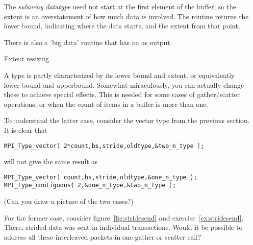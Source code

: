 The \emph{subarray datatype} need not
start at the first element of the buffer, so the extent is an
overstatement of how much data is involved. The routine
 returns the lower bound,
indicating where the data starts, and the extent from that point.

\begin{comment}
  Suppose we implement gather (see also Section Gather ) as a spanning
  tree implemented on top of point-to-point routines. Since the receive
  buffer is only valid on the root process, one will need to allocate
  some temporary space for receiving data on intermediate
  nodes. However, the datatype extent cannot be used as an estimate of
  the amount of space that needs to be allocated, if the user has
  modified the extent, for example by using MPI_TYPE_CREATE_RESIZED. The
  functions MPI_TYPE_GET_TRUE_EXTENT and MPI_TYPE_GET_TRUE_EXTENT_X are
  provided which return the true extent of the datatype.
\end{comment}


There is also a `big data' routine 
that has an  as output.

 {Extent resizing}

A type is partly characterized by its lower bound and extent,
or equivalently lower bound and upperbound.
Somewhat miraculously, you can actually change these to achieve special effects.
This is needed for some cases of gather/scatter operations, or when the count
of items in a buffer is more than one.

To understand the latter case, consider the vector type from the previous section.
It is clear that
\begin{lstlisting}
MPI_Type_vector( 2*count,bs,stride,oldtype,&two_n_type );
\end{lstlisting}
will not give the same result as
\begin{lstlisting}
MPI_Type_vector( count,bs,stride,oldtype,&one_n_type );
MPI_Type_contiguous( 2,&one_n_type,&two_n_type );
\end{lstlisting}
(Can you draw a picture of the two cases?)

For the former case, consider figure~\ref{fig:stridesend} and exercise~\ref{ex:stridesend}.
There, strided data was sent in individual transactions.
Would it be possible to address all these interleaved packets in one
gather or scatter call?

